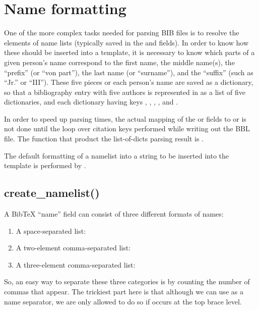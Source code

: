 \documentclass[letterpaper,10pt,english]{sphinxmanual}
\begin{document}
\section{Name formatting}
\label{developer_guide:name-formatting}
One of the more complex tasks needed for parsing BIB files is to resolve the elements of name lists (typically saved in the  and  fields). In order to know how these should be inserted into a template, it is necessary to know which parts of a given person's name correspond to the first name, the middle name(s), the ``prefix'' (or ``von part''), the last name (or ``surname''), and the ``suffix'' (such as ``Jr.'' or ``III''). These five pieces or each person's name are saved as a dictionary, so that a bibliography entry with five authors is represented in  as a list of five dictionaries, and each dictionary having keys , , , , and .

In order to speed up parsing times, the actual mapping of the  or  fields to  or  is not done until the loop over citation keys performed while writing out the BBL file. The function that product the list-of-dicts parsing result is .

The default formatting of a namelist into a string to be inserted into the template is performed by .


\subsection{create\_namelist()}
\label{developer_guide:create-namelist}
A BibTeX ``name'' field can consist of three different formats of names:
\begin{enumerate}
\item {} 
A space-separated list: 

\item {} 
A two-element comma-separated list: 

\item {} 
A three-element comma-separated list: 

\end{enumerate}

So, an easy way to separate these three categories is by counting the number of commas that appear. The trickiest part here is that although we can use  as a name separator, we are only allowed to do so if  occurs at the top brace level.
\end{document}
